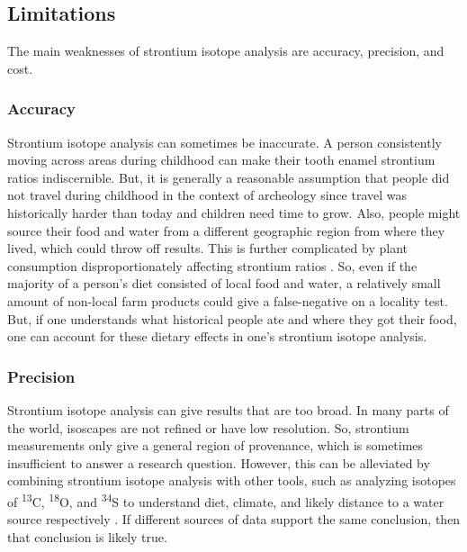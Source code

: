 \documentclass[a4paper, 12pt]{article}
\begin{document}
\subsection{Limitations}
The main weaknesses of strontium isotope analysis are accuracy, precision, and cost.
\subsubsection{Accuracy}
Strontium isotope analysis can sometimes be inaccurate. A person consistently moving
across areas during childhood can make their tooth enamel strontium ratios indiscernible.
But, it is generally a reasonable assumption that people did not travel during childhood
in the context of archeology since travel was historically harder than today and children need time to grow.
Also, people might source their food and water from a different geographic region from where
they lived, which could throw off results.
This is further complicated by plant consumption disproportionately affecting strontium ratios \citep{price2006}.
So, even if the majority of a
person's diet consisted of local food and water, a relatively
small amount of non-local farm products could give a false-negative on a locality test.
But, if one understands what historical people ate and where they got their food,
one can account for these dietary effects in one's strontium isotope analysis.



\subsubsection{Precision}
Strontium isotope analysis can give results that are too broad. In many parts of the world, isoscapes are not
refined or have low resolution.
So, strontium measurements only give a general region of provenance, which is sometimes insufficient to answer a research question.
However, this can be alleviated by combining strontium isotope analysis with other tools,
such as analyzing isotopes of \textsuperscript{13}C, \textsuperscript{18}O, and \textsuperscript{34}S
to understand diet, climate, and likely distance to a water source respectively \citep{madgwick2019}.
If different sources of data support the same conclusion, then that conclusion
is likely true.
\end{document}
